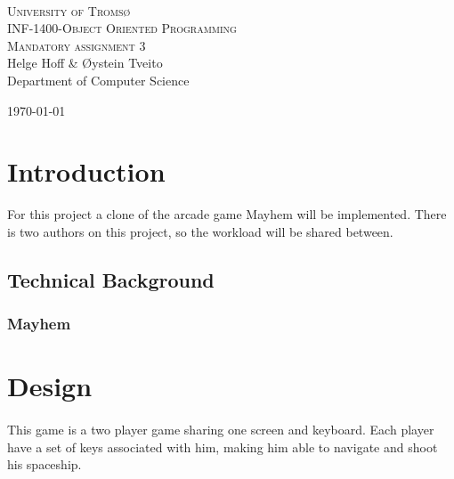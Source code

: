 \documentclass{article}
\def \thetitle {INF-1400-Object Oriented Programming}
\def \thesubtitle {Mandatory assignment 3}
\def \theauthor {Helge Hoff \& Øystein Tveito}
\begin{document}

\begin{titlepage}
\begin{center}

\textsc{\\[3.5cm] \huge University of Tromsø}\\[1.5cm]

\textsc{\LARGE \thetitle}\\[0.5cm]

\textsc{\Large \thesubtitle}\\[1.5cm]

\LARGE{\theauthor} \\[0.5cm] \large{Department of Computer Science}

\vfill
{\large \today}

\end{center}
\thispagestyle{empty}
\end{titlepage}

\newpage{}



\tableofcontents


\newpage{}


\section{Introduction}
For this project a clone of the arcade game Mayhem will be implemented. There is two authors on this project, so the workload will be shared between.
\subsection{Technical Background}
\subsubsection{Mayhem} 
\paragraph{}

\section{Design}
\paragraph{}
This game is a two player game sharing one screen and keyboard. Each player have a set of keys associated with him, making him able to navigate and shoot his spaceship. 
\end{document}
